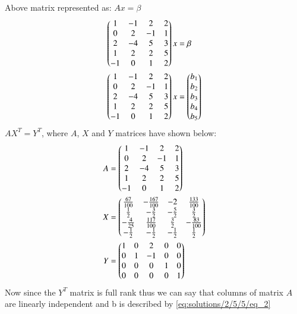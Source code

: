 Above matrix represented as: $Ax = \beta$
\begin{align}
    \begin{pmatrix}1 & -1 & 2 & 2 \\
                    0 & 2 & -1 & 1 \\
                    2 & -4 & 5 & 3 \\
                    1 & 2 & 2 & 5 \\
                    -1 & 0 & 1 & 2\end{pmatrix}x &= \beta\\
    \begin{pmatrix}1 & -1 & 2 & 2 \\
                    0 & 2 & -1 & 1 \\
                    2 & -4 & 5 & 3 \\
                    1 & 2 & 2 & 5 \\
                    -1 & 0 & 1 & 2\end{pmatrix}x &= 
                    \begin{pmatrix}b_1 \\ b_2 \\ b_3\\ b_4 \\ b_5\end{pmatrix} \label{eq:solutions/2/5/5/eq_2}
\end{align}
$AX^T = Y^T$, where $A$, $X$ and $Y$ matrices have shown below:
\begin{align}
    A &= \begin{pmatrix}1 & -1 & 2 & 2 \\
                    0 & 2 & -1 & 1 \\
                    2 & -4 & 5 & 3 \\
                    1 & 2 & 2 & 5 \\
                    -1 & 0 & 1 & 2\end{pmatrix} \\
    X &= \begin{pmatrix}\frac{67}{100}&-\frac{167}{100}&-2&\frac{133}{100}\\
           \frac{1}{2}&-\frac{3}{2}&-\frac{5}{2}&\frac{3}{2}\\
           -\frac{4}{25}&\frac{117}{100}&\frac{3}{2}&-\frac{83}{100}\\
           -\frac{1}{2}&-\frac{1}{2}&-\frac{1}{2}&\frac{1}{2}\end{pmatrix} \\
   Y &= \begin{pmatrix}1 & 0 & 2 & 0 & 0 \\
           0 & 1 & -1 & 0 & 0 \\
           0 & 0 & 0 & 1 & 0 \\
           0 & 0 & 0 & 0 & 1\end{pmatrix}
\end{align}
Now since the $Y^T$ matrix is full rank thus we can say that columns of matrix $A$ are linearly independent and b is described by \eqref{eq:solutions/2/5/5/eq_2}
